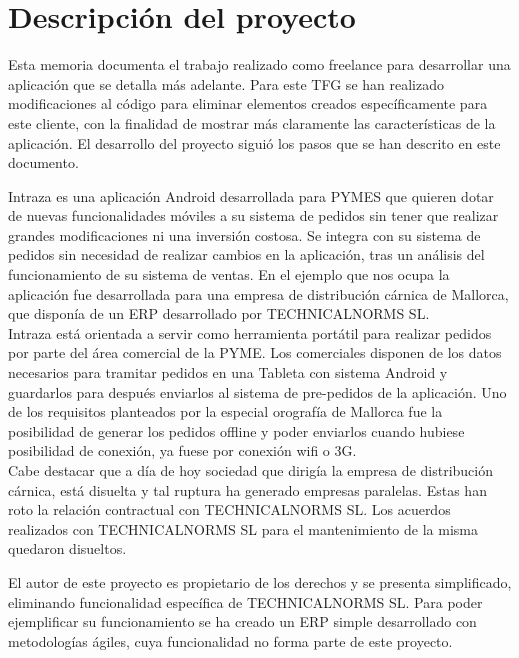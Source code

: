 \chapter{Descripción del proyecto}
\setlength{\parindent}{2em}

Esta memoria documenta el trabajo realizado como freelance para desarrollar una aplicación que se detalla más adelante. Para este TFG se han realizado modificaciones al código para eliminar elementos creados específicamente para este cliente, con la finalidad de mostrar más claramente las características de la aplicación. El desarrollo del proyecto siguió los pasos que se han descrito en este documento.\cite{intDoc} 

Intraza es una aplicación Android desarrollada para PYMES que quieren dotar de nuevas funcionalidades móviles a su sistema de pedidos sin tener que realizar grandes modificaciones ni una inversión costosa.  Se integra con su sistema de pedidos sin necesidad de realizar cambios en la aplicación, tras un análisis del funcionamiento de su sistema de ventas.  En el ejemplo que nos ocupa la aplicación fue desarrollada para una empresa de distribución cárnica de Mallorca, que disponía de un ERP desarrollado por TECHNICALNORMS SL.\\

Intraza está orientada a servir como herramienta portátil para realizar pedidos por parte del área comercial de la PYME. Los comerciales disponen de los datos necesarios para tramitar pedidos en una Tableta con sistema Android y guardarlos para después enviarlos al sistema de pre-pedidos de la aplicación. Uno de los requisitos planteados por la especial orografía de Mallorca fue la posibilidad de generar los pedidos offline y poder enviarlos cuando hubiese posibilidad de conexión, ya fuese por conexión wifi o 3G.\\

Cabe destacar que a día de hoy sociedad que dirigía la empresa de distribución cárnica, está disuelta y tal ruptura ha generado empresas paralelas. Estas han roto la relación contractual con TECHNICALNORMS SL.  Los acuerdos realizados con TECHNICALNORMS SL para el mantenimiento de la misma quedaron disueltos. 

El autor de este proyecto es propietario de los derechos y se presenta  simplificado, eliminando funcionalidad específica de TECHNICALNORMS SL. Para poder ejemplificar su funcionamiento se ha creado un ERP simple desarrollado con metodologías ágiles, cuya funcionalidad no forma parte de este proyecto.\\

